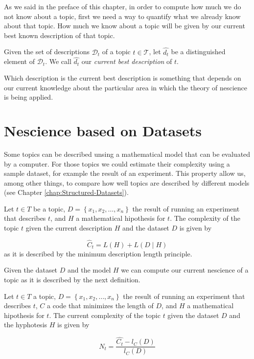 As we said in the preface of this chapter, in order to compute how much we do not know about a topic, first we need a way to quantify what we already know about that topic. How much we know about a topic will be given by our current best known description of that topic.

\begin{definition}
Given the set of descriptions $\mathcal{D}_t$ of a topic $t \in \mathcal{T}$, let $\hat{d_{t}}$ be a distinguished element of $\mathcal{D}_t$. We call $\hat{d_{t}}$ our \emph{current best description} of $t$.
\end{definition}

Which description is the current best description is something that depends on our current knowledge about the particular area in which the theory of nescience is being applied.


%
%

\section{Nescience based on Datasets}
\label{sec:nescience_datasets}

Some topics can be described unsing a mathematical model that can
be evaluated by a computer. For those topics we could estimate their
complexity using a sample dataset, for example the result of an experiment.
This property allow us, among other things, to compare how well topics
are described by different models (see Chapter \ref{chap:Structured-Datasets}).

\begin{definition}
Let $t\in T$ be a topic, $D=\left\{ x_{1},x_{2},\ldots,x_{n}\right\} $
the result of running an experiment that describes $t$, and $H$
a mathematical hipothesis for $t$. The complexity of the topic $t$
given the current description $H$ and the dataset $D$ is given by

\[
\hat{C}_{t}=L(H)+L(D\mid H)
\]
as it is described by the minimum description length principle.
\end{definition}

Given the dataset $D$ and the model $H$ we can compute our current
nescience of a topic as it is described by the next definition.

\begin{definition}
Let $t\in T$ a topic, $D=\left\{ x_{1},x_{2},\ldots,x_{n}\right\} $
the result of running an experiment that describes $t$, $C$ a code
that minimizes the length of $D$, and $H$ a mathematical hipothesis
for $t$. The current complexity of the topic $t$ given the dataset
$D$ and the hyphotesis $H$ is given by

\[
N_{t}=\frac{\hat{C_{t}}-l_{C}(D)}{l_{C}(D)}
\]

\end{definition}

